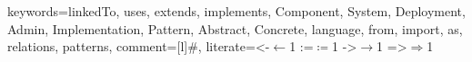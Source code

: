 
\usepackage{listings}
\usepackage{mathtools}

  {%
  keywords={linkedTo, uses, extends, implements,
    Component, System, Deployment, Admin, Implementation,
    Pattern,
    Abstract, Concrete,
    language, from, import, as, relations, patterns},
  comment=[l]\#,
  literate={<-}{{$\leftarrow$}}{1} {:=}{{$\coloneqq$}}{1} {->}{{$\rightarrow$}}{1} {=>}{{$\Rightarrow$}}{1}
}
